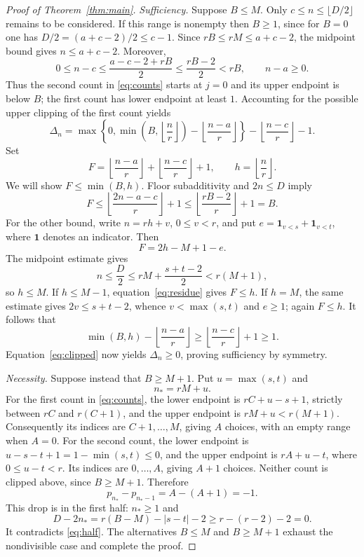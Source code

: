 \documentclass[11pt]{article}
\newcommand{\ind}{\mathbf{1}}
\begin{document}
\begin{proof}[Proof of Theorem~\ref{thm:main}]
\emph{Sufficiency.}
Suppose $B\le M$. Only $c\le n\le\lfloor D/2\rfloor$ remains to be
considered. If this range is nonempty then $B\ge1$, since for $B=0$ one
has $D/2=(a+c-2)/2\le c-1$.
Since $rB\le rM\le a+c-2$, the midpoint bound gives $n\le a+c-2$.
Moreover,
\[
 0\le n-c\le\frac{a-c-2+rB}{2}\le\frac{rB-2}{2}<rB,
 \qquad n-a\ge0.
\]
Thus the second count in \eqref{eq:counts} starts at $j=0$ and its upper
endpoint is below $B$; the first count has lower endpoint at least $1$.
Accounting for the possible upper clipping of the first count yields
\begin{equation}\label{eq:clipped}
 \Delta_n=\max\!\left\{0,\min\!\left(B,\left\lfloor \frac nr\right\rfloor\right)
                -\left\lfloor \frac{n-a}{r}\right\rfloor\right\}
               -\left\lfloor \frac{n-c}{r}\right\rfloor-1.
\end{equation}
Set
\[
 F=\left\lfloor \frac{n-a}{r}\right\rfloor+\left\lfloor \frac{n-c}{r}\right\rfloor+1,
 \qquad h=\left\lfloor \frac nr\right\rfloor.
\]
We will show $F\le\min(B,h)$. Floor subadditivity and $2n\le D$ imply
\begin{equation}\label{eq:floor-bound}
 F\le\left\lfloor \frac{2n-a-c}{r}\right\rfloor+1
   \le\left\lfloor \frac{rB-2}{r}\right\rfloor+1=B.
\end{equation}
For the other bound, write $n=rh+v$, $0\le v<r$, and put
$e=\ind_{v<s}+\ind_{v<t}$, where $\ind$ denotes an indicator. Then
\begin{equation}\label{eq:residue}
 F=2h-M+1-e.
\end{equation}
The midpoint estimate gives
\[
 n\le\frac D2\le rM+\frac{s+t-2}{2}<r(M+1),
\]
so $h\le M$. If $h\le M-1$, equation~\eqref{eq:residue} gives $F\le h$.
If $h=M$, the same estimate gives $2v\le s+t-2$, whence
$v<\max(s,t)$ and $e\ge1$; again $F\le h$.
It follows that
\[
 \min(B,h)-\left\lfloor \frac{n-a}{r}\right\rfloor
 \ge\left\lfloor \frac{n-c}{r}\right\rfloor+1\ge1.
\]
Equation~\eqref{eq:clipped} now yields $\Delta_n\ge0$, proving sufficiency
by symmetry.

\emph{Necessity.}
Suppose instead that $B\ge M+1$. Put $u=\max(s,t)$ and
\begin{equation}\label{eq:witness}
 n_*=rM+u.
\end{equation}
For the first count in \eqref{eq:counts}, the lower endpoint is
$rC+u-s+1$, strictly between $rC$ and $r(C+1)$, and the upper endpoint
is $rM+u<r(M+1)$. Consequently its indices are $C+1,\ldots,M$,
giving $A$ choices, with an empty range when $A=0$.
For the second count, the lower endpoint is
$u-s-t+1=1-\min(s,t)\le0$, and the upper endpoint is $rA+u-t$,
where $0\le u-t<r$. Its indices are $0,\ldots,A$, giving $A+1$ choices.
Neither count is clipped above, since $B\ge M+1$. Therefore
\begin{equation}\label{eq:drop}
 p_{n_*}-p_{n_*-1}=A-(A+1)=-1.
\end{equation}
This drop is in the first half: $n_*\ge1$ and
\[
 D-2n_*=r(B-M)-|s-t|-2\ge r-(r-2)-2=0.
\]
It contradicts \eqref{eq:half}. The alternatives $B\le M$ and $B\ge M+1$
exhaust the nondivisible case and complete the proof.
\end{proof}
\end{document}
